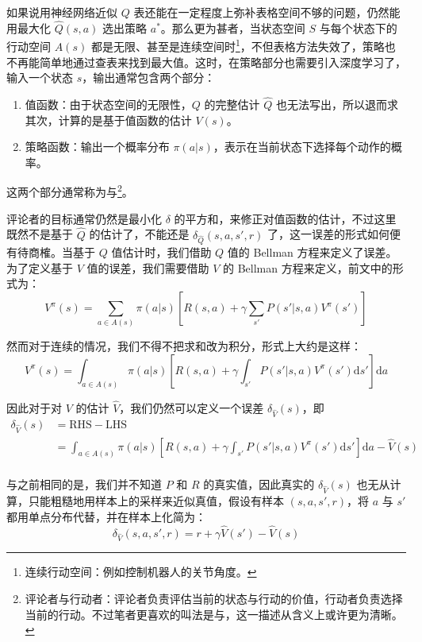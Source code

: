 如果说用神经网络近似 $Q$ 表还能在一定程度上弥补表格空间不够的问题，仍然能用最大化 $\hat Q(s, a)$ 选出策略 $a^*$。那么更为甚者，当状态空间 $S$ 与每个状态下的行动空间 $A(s)$ 都是无限、甚至是连续空间时\footnote{连续行动空间：例如控制机器人的关节角度。}，不但表格方法失效了，策略也不再能简单地通过查表来找到最大值。这时，在策略部分也需要引入深度学习了，输入一个状态 $s$，输出通常包含两个部分：
\begin{enumerate}
    \item 值函数：由于状态空间的无限性，$Q$ 的完整估计 $\hat Q$ 也无法写出，所以退而求其次，计算的是基于值函数的估计 $V(s)$。
    \item 策略函数：输出一个概率分布 $\pi(a | s)$，表示在当前状态下选择每个动作的概率。
\end{enumerate}

这两个部分通常称为与\footnote{评论者与行动者：评论者负责评估当前的状态与行动的价值，行动者负责选择当前的行动。不过笔者更喜欢的叫法是与，这一描述从含义上或许更为清晰。}。

评论者的目标通常仍然是最小化 $\delta$ 的平方和，来修正对值函数的估计，不过这里既然不是基于 $\hat Q$ 的估计了，不能还是 $\delta_{\hat Q} (s, a, s', r)$ 了，这一误差的形式如何便有待商榷。当基于 $Q$ 值估计时，我们借助 $Q$ 值的 Bellman 方程来定义了误差。为了定义基于 $V$ 值的误差，我们需要借助 $V$ 的 Bellman 方程来定义，前文中的形式为：
\[
    V^\pi (s) = \sum_{a \in A(s)} \pi(a | s) \left[ R(s, a) + \gamma \sum_{s'} P(s' | s, a) V^\pi (s')\right]
\]

然而对于连续的情况，我们不得不把求和改为积分，形式上大约是这样：
\[
    V^\pi (s) = \int_{a \in A(s)} \pi(a | s) \left[ R(s, a) + \gamma \int_{s'} P(s' | s, a) V^\pi (s')\mathrm{d}s'\right] \mathrm{d}a
\]

因此对于对 $V$ 的估计 $\hat V$，我们仍然可以定义一个误差 $\delta_{\hat V} (s)$，即
\[
    \begin{aligned}
        \delta_{\hat V} (s) & = \text{RHS} - \text{LHS}                                                                                                            \\
                            & = \int_{a \in A(s)} \pi(a | s) \left[ R(s, a) + \gamma \int_{s'} P(s' | s, a) V^\pi (s')\mathrm{d}s'\right] \mathrm{d}a - \hat V (s) \\
    \end{aligned}
\]

与之前相同的是，我们并不知道 $P$ 和 $R$ 的真实值，因此真实的 $\delta_{\hat V} (s)$ 也无从计算，只能粗糙地用样本上的采样来近似真值，假设有样本 $(s, a, s', r)$，将 $a$ 与 $s'$ 都用单点分布代替，并在样本上化简为：
\[
    \delta_{\hat V} (s, a, s', r) = r + \gamma \hat V (s') - \hat V (s)
\]

